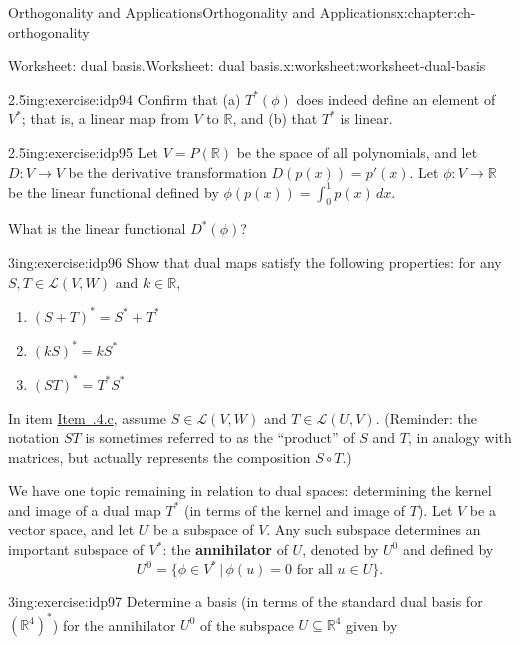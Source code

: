 \documentclass[oneside,10pt,]{book}
\newcommand{\xreffont}{\relax}
\newcommand{\terminology}[1]{\textbf{#1}}
\numberwithin{equation}{section}
\newcommand{\R}{\mathbb{R}}
\begin{document}
\begin{chapterptx}{Orthogonality and Applications}{}{Orthogonality and Applications}{}{}{x:chapter:ch-orthogonality}
\begin{worksheet-section}{Worksheet: dual basis.}{}{Worksheet: dual basis.}{}{}{x:worksheet:worksheet-dual-basis}
\begin{divisionexercise}{2}{}{2.5in}{g:exercise:idp94}%
Confirm that (a) \(T^*(\phi)\) does indeed define an element of \(V^*\); that is, a linear map from \(V\) to \(\R\), and (b) that \(T^*\) is linear.%
\end{divisionexercise}%
\begin{divisionexercise}{3}{}{2.5in}{g:exercise:idp95}%
Let \(V=P(\R)\) be the space of all polynomials, and let \(D:V\to V\) be the derivative transformation \(D(p(x))=p'(x)\). Let \(\phi:V\to \R\) be the linear functional defined by \(\phi(p(x)) = \int_0^1 p(x)\,dx\).%
\par
What is the linear functional \(D^*(\phi)\)?%
\end{divisionexercise}%
\clearpage
\begin{divisionexercise}{4}{}{3in}{g:exercise:idp96}%
Show that dual maps satisfy the following properties: for any \(S,T\in \mathcal{L}(V,W)\) and \(k\in \R\),%
\begin{enumerate}[label=(\alph*)]
\item{}\(\displaystyle (S+T)^* = S^*+T^*\)%
\item{}\(\displaystyle (kS)^* = kS^*\)%
\item\hypertarget{x:li:list-property-last}{}\(\displaystyle (ST)^* = T^*S^*\)%
\end{enumerate}
%
\par
In item \hyperlink{x:li:list-property-last}{Item~{\xreffont 3.3.4.c}}, assume \(S\in \mathcal{L}(V,W)\) and \(T\in \mathcal{L}(U,V)\). (Reminder: the notation \(ST\) is sometimes referred to as the ``product'' of \(S\) and \(T\), in analogy with matrices, but actually represents the composition \(S\circ T\).)%
\end{divisionexercise}%
We have one topic remaining in relation to dual spaces: determining the kernel and image of a dual map \(T^*\) (in terms of the kernel and image of \(T\)). Let \(V\) be a vector space, and let \(U\) be a subspace of \(V\). Any such subspace determines an important subspace of \(V^*\): the \terminology{annihilator} of \(U\), denoted by \(U^0\) and defined by%
\begin{equation*}
U^0 = \{\phi\in V^* \,|\, \phi(u)=0 \text{ for all } u\in U\}\text{.}
\end{equation*}
%
\begin{divisionexercise}{5}{}{3in}{g:exercise:idp97}%
Determine a basis (in terms of the standard dual basis for \((\R^4)^*\)) for the annihilator \(U^0\) of the subspace \(U\subseteq \R^4\) given by%

\end{divisionexercise}
\end{worksheet-section}
\end{chapterptx}
\end{document}
